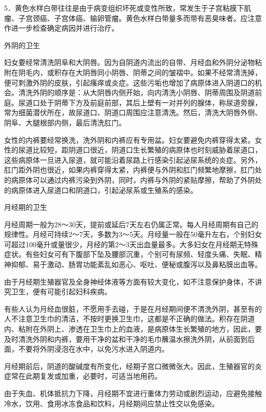 \documentclass[12pt,UTF8]{ctexbook}
\begin{document}
5．黄色水样白带往往是由于病变组织坏死或变性所致，常发生于子宫粘膜下肌瘤、子宫颈癌、子宫体癌、输卵管瘤。黄色水样白带量多而带有恶臭味者。应注意作进一步检查确定病因并进行治疗。

外阴的卫生

妇女要经常清洗阴阜和大阴唇。因为自阴道内流出的自带、月经血和外阴分泌物粘附在阴毛内，或积存在大阴唇同小阴唇、阴蒂之间的皱褶中。如果不经常清洗掉，便可刺激外阴的皮肤，引起瘙痒或炎症。这些污垢也增加了病原体进入阴道口的机会。清洗外阴的顺序是：从大阴唇内侧开始，向内清洗小阴唇、阴蒂周围及阴道前庭。尿道口处于阴蒂下方及前庭前部，其后上壁有一对并列的腺体，称尿道旁腺，常为细菌潜伏所在，故尿道口、阴道口周围应注意清洗。然后，清洗大阴唇外侧、阴阜、大腿根部内侧，最后清洗肛门。

女性的内裤要经常换洗，洗外阴和内裤应有专用盆。妇女要避免内裤穿得太紧。女性的尿道比较短，距阴道口很近，阴道口生长繁殖的病原体也时刻威胁着尿道口，这些病原体一旦进入尿道，就可能沿着尿路上行感染引起泌尿系统的炎症。另外，肛门距外阴也很近，如果内裤穿得太紧，内裤便与外阴和肛门频繁地摩擦，肛门处的病原体可以通过内裤污染到外阴，同时，内裤与外阴的紧贴摩擦，帮助了外阴处的病原体进入尿道口和阴道口，引起泌尿系或生殖系的感染。

月经期的卫生

月经周期一般为28～30天，提前或延后7天左右仍属正常。每人月经周期有自己的规律性。月经可持续2～7天，多数为3～5天。月经量一般在50毫升左右，个别妇女可超过100毫升或量很少，月经的第2～3天出血量最多。大多妇女在月经期无特殊症状。有些妇女可有下腹部下坠及腰部沉重，个别可有尿频、轻度头痛、失眠、精神抑郁、易于激动、肠胃功能紊乱如恶心、呕吐、便秘或腹泻以及鼻粘膜出血等。

由于月经期生殖器官及全身神经体液等方面有较大变化，如不注意保护身体，不讲究卫生，便有可能引起妇科疾病。

有些人认为月经血很脏，不愿用手去碰，于是在月经期间便不清洗外阴，甚至有的人不注意卫生巾的清洁，不按时更换卫生巾，这都是不正确的做法。积存在阴道内、粘附在外阴上、渗透在卫生巾上的血液，是病原体生长繁殖的地方，因此，要及时清洗外阴和内裤，要用干净的盆和干净的毛巾蘸温水擦洗外阴，从前面到后面，不要将外阴浸泡在水中，以免污水进入阴道内。

月经期前后，阴道的酸碱度有所变化，经期子宫口微微张大。因此，生殖器官的炎症常在此期复发或加重，必要时，可适当地用药。

由于失血、机体抵抗力下降，月经期不宜进行重体力劳动或剧烈运动，应避免接触冷水，饮用、食用冰冻食品和饮料，月经期间应禁止性交以免感染。
\end{document}
